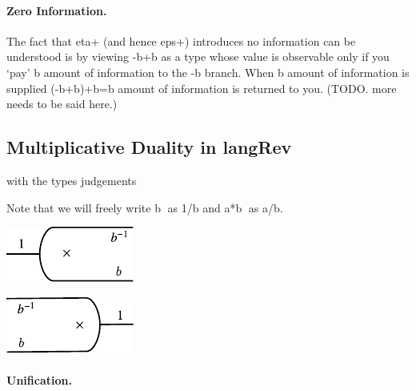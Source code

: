 \documentclass[preprint]{sigplanconf}
\begin{document}
\paragraph*{Zero Information.}
The fact that {{eta+}} (and hence {{eps+}}) introduces no information
can be understood is by viewing {{-b+b}} as a type whose value is
observable only if you `pay' {{b}} amount of information to the {{-b}}
branch. When {{b}} amount of information is supplied {{(-b+b)+b=b}}
amount of information is returned to you. (TODO. more needs to be said
here.)

\subsection{Multiplicative Duality in {{langRev}} }

%

\noindent
with the types judgements



Note that we will freely write {{b^^^}} as {{1/b}} and {{a*b^^^}} as
{{a/b}}.

\begin{multicols}{2}
\begin{center}
  \includegraphics{diagrams/eta_times.pdf}
\end{center}
  
\begin{center}
  \includegraphics{diagrams/eps_times.pdf}
\end{center}
\end{multicols}


\paragraph*{Unification.}
\end{document}
